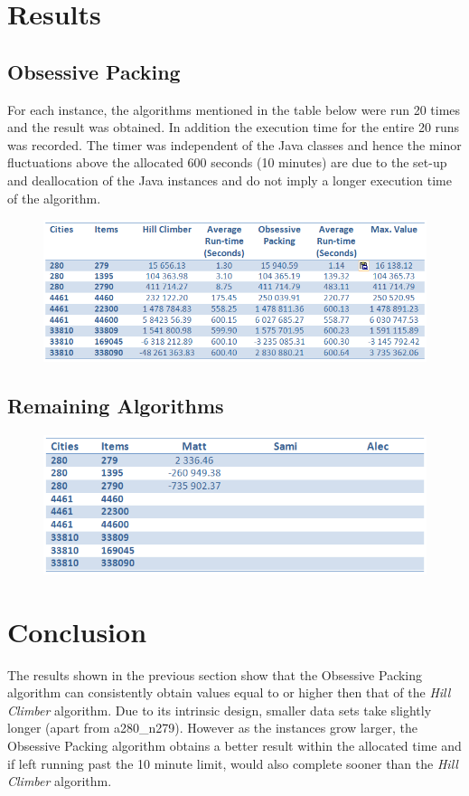 \documentclass[a4paper,12pt]{article}
\begin{document}
\newpage
\section{Results}
\subsection{Obsessive Packing}
For each instance, the algorithms mentioned in the table below were run 20 times and the result was obtained. In addition the execution time for the entire 20 runs was recorded. The timer was independent of the Java classes and hence the minor fluctuations above the allocated 600 seconds (10 minutes) are due to the set-up and deallocation of the Java instances and do not imply a longer execution time of the algorithm.
\begin{figure}[h]
\centering
\includegraphics[width=\linewidth]{ResultsTable.png}
\end{figure}

\subsection{Remaining Algorithms}
\begin{figure}[h]
\centering
\includegraphics[width=14cm]{AlgorithmResults.png}
\end{figure}

\newpage
\section{Conclusion}
The results shown in the previous section show that the Obsessive Packing algorithm can consistently obtain values equal to or higher then that of the \textit{Hill Climber} algorithm. Due to its intrinsic design, smaller data sets take slightly longer (apart from a280\_n279). However as the instances grow larger,  the Obsessive Packing algorithm obtains a better result within the allocated time and if left running past the 10 minute limit, would also complete sooner than the \textit{Hill Climber} algorithm.\\
\end{document}
